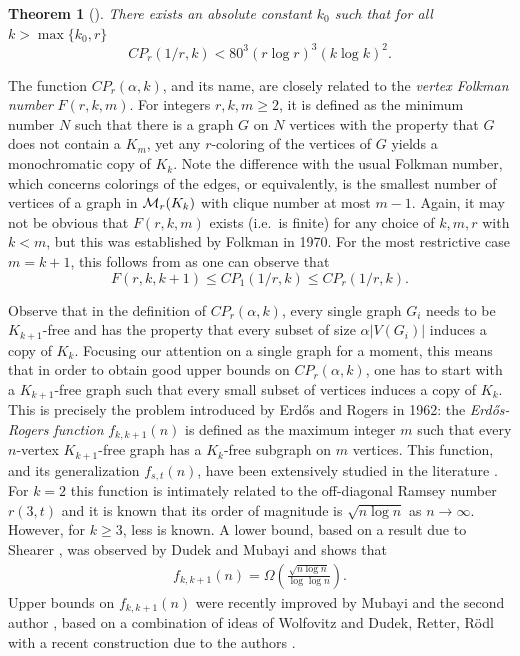 \documentclass[12pt]{article}
\newcommand{\cM}{{\cal M}}
\newtheorem{theorem}{Theorem}
\theoremstyle{definition}
\begin{document}
	\begin{theorem}[\cite{han}]\label{thm:HRS1}
		There exists an absolute constant $k_0$ such that for all $k > \max\{k_0,r\}$ 
		\[CP_r(1/r,k) < 80^3(r\log r)^3(k\log k)^2.\]
	\end{theorem}
	
	The function $CP_r(\alpha,k)$, and its name, are closely related to the \textit{vertex Folkman number} $F(r,k,m)$. For integers $r,k,m \geq 2$, it is defined as the minimum number $N$ such that there is a graph $G$ on $N$ vertices with the property that $G$ does not contain a $K_m$, yet any $r$-coloring of the vertices of $G$ yields a monochromatic copy of $K_k$. Note the difference with the usual Folkman number, which concerns colorings of the edges, or equivalently, is the smallest number of vertices of a graph in $\cM_r(K_k)$ with clique number at most $m-1$. Again, it may not be obvious that $F(r,k,m)$ exists (i.e.\ is finite) for any choice of $k,m,r$ with $k < m$, but this was established by Folkman \cite{Folkman70} in 1970. For the most restrictive case $m = k+1$, this follows from  as one can observe that 
	\[F(r,k,k+1) \leq CP_1(1/r,k) \leq CP_r(1/r,k). \]
	
	
	Observe that in the definition of $CP_r(\alpha,k)$, every single graph $G_i$ needs to be $K_{k+1}$-free and has the property that every subset of size $\alpha|V(G_i)|$ induces a copy of $K_k$. Focusing our attention on a single graph for a moment, this means that in order to obtain good upper bounds on $CP_r(\alpha,k)$, one has to start with a $K_{k+1}$-free graph such that every small subset of vertices induces a copy of $K_k$. This is precisely the problem introduced by Erd\H{o}s and Rogers \cite{ER62} in 1962: the \textit{Erd\H{o}s-Rogers function} $f_{k,k+1}(n)$ is defined as the maximum integer $m$ such that every $n$-vertex $K_{k+1}$-free graph has a $K_k$-free subgraph on $m$ vertices. This function, and its generalization $f_{s,t}(n)$, have been extensively studied in the literature \cite{Wolfovitz13,DRR14,JS23}. For $k = 2$ this function is intimately related to the off-diagonal Ramsey number $r(3,t)$ and it is known that its order of magnitude is $\sqrt{n\log n}$ as $n \to \infty$. However, for $k \geq 3$, less is known. A lower bound, based on a result due to Shearer \cite{Shearer}, was observed by Dudek and Mubayi and shows that
	\begin{align}\label{eq:ERlowerbound}
		f_{k,k+1}(n) = \Omega \left( \frac{\sqrt{n\log n}}{\log\log n} \right).
	\end{align}
	Upper bounds on $f_{k,k+1}(n)$ were recently improved by Mubayi and the second author \cite{mubayi2024order}, based on a combination of ideas of Wolfovitz \cite{Wolfovitz13} and Dudek, Retter, R\"odl \cite{DRR14} with a recent construction due to the authors \cite{mattheus2024asymptotics}.
	
\end{document}
